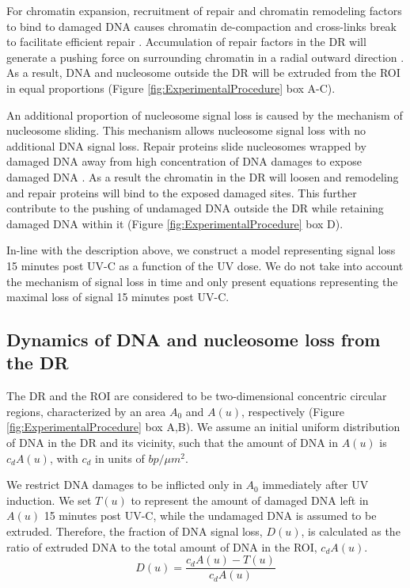 \documentclass[12pt]{article}
\begin{document}
	For chromatin expansion, recruitment of repair and chromatin remodeling factors to bind to damaged DNA causes chromatin de-compaction and cross-links break to facilitate efficient repair \cite{gaillard2003chromatin,luijsterburg2012ddb2,deem2012epigenetic}. Accumulation of repair factors in the DR will generate a pushing force on surrounding chromatin in a radial outward direction \cite{dinant2007activation}. As a result, DNA and nucleosome outside the DR will be extruded from the ROI in equal proportions (Figure \ref{fig:ExperimentalProcedure} box A-C).
	
	An additional proportion of nucleosome signal loss is caused by the mechanism of nucleosome sliding. This mechanism allows nucleosome signal loss with no additional DNA signal loss. Repair proteins slide nucleosomes wrapped by damaged DNA away from high concentration of DNA damages to expose damaged DNA \cite{gaillard2003chromatin}. As a result the chromatin in the DR will loosen and remodeling and repair proteins will bind to the exposed damaged sites. This further contribute to the pushing of undamaged DNA outside the DR while retaining damaged DNA within it (Figure \ref{fig:ExperimentalProcedure} box D).  

    In-line with the description above, we construct a model representing
	signal loss 15 minutes post UV-C as a function of the UV dose. We do not take into account the
	mechanism of signal loss in time and only present equations representing the maximal loss of signal 15 minutes post UV-C.
	

	\subsection{Dynamics of DNA and nucleosome loss from the DR}
	The DR and the ROI are considered to be two-dimensional concentric circular regions, characterized by an area $A_0$ and $A(u)$, respectively (Figure \ref{fig:ExperimentalProcedure} box A,B). We assume an initial uniform distribution of DNA in the DR and its vicinity, such that the amount of DNA in $A(u)$ is $c_dA(u)$, with $c_d$ in units of $bp/\mu m^2$. 
	
	We restrict DNA damages to be inflicted only in $A_0$ immediately after UV induction. We set $T(u)$ to represent the amount of damaged DNA left in $A(u)$ 15 minutes post UV-C, while the undamaged DNA is assumed to be extruded. Therefore, the fraction of DNA signal loss, $D(u)$, is calculated as the ratio of extruded DNA to the total amount of DNA in the ROI, $c_dA(u)$. 
	\begin{equation}\label{eq:DNALossFraction}
	D(u) = \frac{c_dA(u)- T(u)}{c_dA(u)}
	\end{equation}
	
\end{document}
